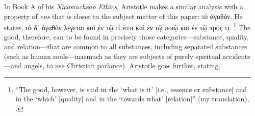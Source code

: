 In Book Α of his \emph{Nicomachean Ethics}, Aristotle makes a similar analysis with a property of \emph{ens} that is closer to the subject matter of this paper: τὸ ἀγαθόν. He states, τὸ δ᾽ ἀγαθὸν λέγεται καὶ ἐν τῷ τί ἐστι καὶ ἐν τῷ ποιῷ καὶ ἐν τῷ πρός τι.%
%
\footnote{\enquote{The good, however, is said in the \enquote{what is it} [i.e., essence or substance] and in the \enquote{which} [quality] and in the \enquote{towards what} [relation]} (my translation), \cite[Α, 1, 1096a19-23]{aristotle:ethics}.}
%
The good, therefore, can to be found in precisely those categories—substance, quality, and relation—that are common to all substances, including separated substances (such as human souls—inasmuch as they are subjects of purely spiritual accidents—and angels, to use Christian parlance). Aristotle goes further, stating,

